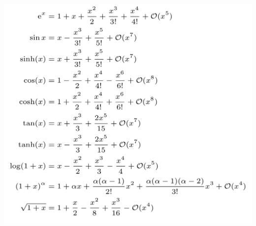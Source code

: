 \begin{multicols}{2}

    \includegraphics[width=0.8\linewidth]{./assets/taylor-polynomials.png}
\end{multicols}
